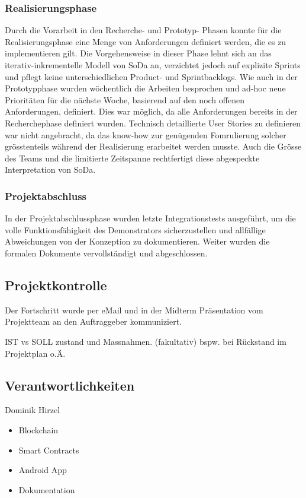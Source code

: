 \subsubsection{Realisierungsphase}
Durch die Vorarbeit in den Recherche- und Prototyp- Phasen konnte für die Realisierungsphase eine Menge von Anforderungen definiert werden, die es zu implementieren gilt. Die Vorgehensweise in dieser Phase lehnt sich an das iterativ-inkrementelle Modell von SoDa an, verzichtet jedoch auf explizite Sprints und pflegt keine unterschiedlichen Product- und Sprintbacklogs. Wie auch in der Prototypphase wurden wöchentlich die Arbeiten besprochen und ad-hoc neue Prioritäten für die nächste Woche, basierend auf den noch offenen Anforderungen, definiert. Dies war möglich, da alle Anforderungen bereits in der Recherchephase definiert wurden. Technisch detaillierte User Stories zu definieren war nicht angebracht, da das know-how zur genügenden Fomrulierung solcher grösstenteils während der Realisierung erarbeitet werden musste. Auch die Grösse des Teams und die limitierte Zeitspanne rechtfertigt diese abgespeckte Interpretation von SoDa.

\subsubsection{Projektabschluss}
In der Projektabschlussphase wurden letzte Integrationstests ausgeführt, um die volle Funktionsfähigkeit des Demonstrators sicherzustellen und allfällige Abweichungen von der Konzeption zu dokumentieren. Weiter wurden die formalen Dokumente vervollständigt und abgeschlossen.

\subsection{Projektkontrolle}
Der Fortschritt wurde per eMail und in der Midterm Präsentation vom Projektteam an den Auftraggeber kommuniziert.

IST vs SOLL zustand und Massnahmen. (fakultativ)
bspw. bei Rückstand im Projektplan o.Ä.


\subsection{Verantwortlichkeiten}
Dominik Hirzel
\begin{itemize}
    \item Blockchain
    \item Smart Contracts
    \item Android App
    \item Dokumentation
\end{itemize}

